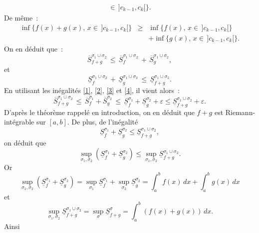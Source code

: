 {\begin{enumerate}
{\begin{eqnarray*}
\in \,]c_{k-1}, c_{k}[\}.
\end{eqnarray*}
De m\^eme~:
\begin{eqnarray*}
\inf\{f(x) + g(x), \,x \in \,]c_{k-1}, c_{k}[\} & \geq &
\inf\{f(x),\,x \in \,]c_{k-1}, c_{k}[\}\\ & & + \inf\{g(x), \,x
\in \,]c_{k-1}, c_{k}[\}.
\end{eqnarray*}
On en d\'eduit que~:
\begin{equation}\label{3}
\overline{S}_{f+g}^{\sigma_{1}\cup\sigma_{2}} \,\leq\,
\overline{S}_{f}^{\sigma_{1}\cup\sigma_{2}}\,+\,\overline{S}_{g}^{\sigma_{1}\cup\sigma_{2}},
\end{equation}
et
\begin{equation}\label{4}
\underline{S}_{f}^{\sigma_{1}\cup\sigma_{2}}\,+\,
\underline{S}_{g}^{\sigma_{1}\cup\sigma_{2}} \,\leq\,
\underline{S}_{f+g}^{\sigma_{1}\cup\sigma_{2}}.
\end{equation}
En utilisant les in\'egalit\'es \eqref{1}, \eqref{2}, \eqref{3} et
\eqref{4}, il vient alors~:
\begin{equation*}
\overline{S}_{f+g}^{\sigma_{1}\cup\sigma_{2}}\,\leq\,
\overline{S}_{f}^{\sigma_{1}}+
\overline{S}_{g}^{\sigma_{2}}\,\leq\,
\underline{S}_{f}^{\sigma_{1}} + \underline{S}_{g}^{\sigma_{2}} +
\varepsilon \leq \underline{S}_{f+g}^{\sigma_{1}\cup\sigma_{2}} +
\varepsilon.
\end{equation*}
D'apr\`es le th\'eor\`eme rappel\'e en introduction, on en d\'eduit que $f+g$ est
Riemann-int\'egrable sur $[a, b]$. De plus, de l'in\'egalit\'e
\begin{equation*}
\underline{S}_{f}^{\sigma_{1}} + \underline{S}_{g}^{\sigma_{2}}
\leq \underline{S}_{f+g}^{\sigma_{1}\cup\sigma_{2}},
\end{equation*}
on d\'eduit que
\begin{equation*}
\sup_{\sigma_1, \sigma_{2}}\left(\underline{S}_{f}^{\sigma_{1}} +
\underline{S}_{g}^{\sigma_{2}} \right) \leq \sup_{\sigma_1,
\sigma_{2}}\underline{S}_{f+g}^{\sigma_{1}\cup\sigma_{2}}.
\end{equation*}
Or $$\sup_{\sigma_1,
\sigma_{2}}\left(\underline{S}_{f}^{\sigma_{1}} +
\underline{S}_{g}^{\sigma_{2}} \right) =
\sup_{\sigma_{1}}\underline{S}_{f}^{\sigma_{1}} +
\sup_{\sigma_{2}}\underline{S}_{g}^{\sigma_{2}} = \int_{a}^{b}
f(x)\,dx + \int_{a}^{b} g(x)\,dx $$ et
$$\sup_{\sigma_1,
\sigma_{2}}\underline{S}_{f+g}^{\sigma_{1}\cup\sigma_{2}} =
\sup_{\sigma}\underline{S}_{f+g}^{\sigma} = \int_{a}^{b}\left(f(x)
+ g(x)\right)\,dx.$$ Ainsi
\begin{equation*}

\end{equation*}}
\end{enumerate}}

